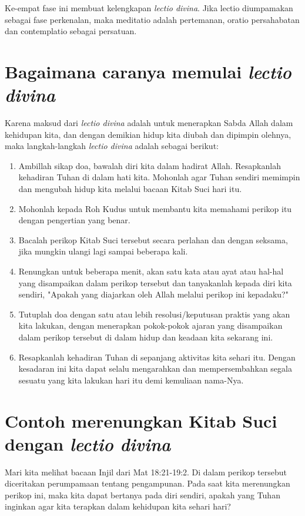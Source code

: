 Ke-empat fase ini membuat kelengkapan \textit{lectio divina}. Jika lectio diumpamakan sebagai fase perkenalan, maka meditatio adalah pertemanan, oratio persahabatan dan contemplatio sebagai persatuan.

\section{Bagaimana caranya memulai \textit{lectio divina}}
Karena maksud dari \textit{lectio divina} adalah untuk menerapkan Sabda Allah dalam kehidupan kita, dan dengan demikian hidup kita diubah dan dipimpin olehnya, maka langkah-langkah \textit{lectio divina} adalah sebagai berikut:
\begin{enumerate}
\item    Ambillah sikap doa, bawalah diri kita dalam hadirat Allah. Resapkanlah kehadiran Tuhan di dalam hati kita. Mohonlah agar Tuhan sendiri memimpin dan mengubah hidup kita melalui bacaan Kitab Suci hari itu.
\item     Mohonlah kepada Roh Kudus untuk membantu kita memahami perikop itu dengan pengertian yang benar.
\item Bacalah perikop Kitab Suci tersebut secara perlahan dan dengan seksama, jika mungkin ulangi lagi sampai beberapa kali.
\item Renungkan untuk beberapa menit, akan satu kata atau ayat atau hal-hal yang disampaikan dalam perikop tersebut dan tanyakanlah kepada diri kita sendiri, "Apakah yang diajarkan oleh Allah melalui perikop ini kepadaku?"
\item Tutuplah doa dengan satu atau lebih resolusi/keputusan praktis yang akan kita lakukan, dengan menerapkan pokok-pokok ajaran yang disampaikan dalam perikop tersebut di dalam hidup dan keadaan kita sekarang ini.
\item Resapkanlah kehadiran Tuhan di sepanjang aktivitas kita sehari itu. Dengan kesadaran ini kita dapat selalu mengarahkan dan mempersembahkan segala sesuatu yang kita lakukan hari itu demi kemuliaan nama-Nya.
\end{enumerate}

\section{Contoh merenungkan Kitab Suci dengan \textit{lectio divina}}
Mari kita melihat bacaan Injil dari Mat 18:21-19:2. Di dalam perikop tersebut diceritakan perumpamaan tentang pengampunan. Pada saat kita merenungkan perikop ini, maka kita dapat bertanya pada diri sendiri, apakah yang Tuhan inginkan agar kita terapkan dalam kehidupan kita sehari hari?

